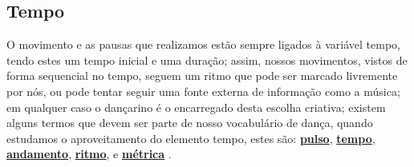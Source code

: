 \subsection{Tempo}
O movimento e as pausas que realizamos estão sempre ligados à variável tempo,
tendo estes um tempo inicial e uma duração;
assim, nossos movimentos, vistos de forma sequencial no tempo, 
seguem um ritmo que pode ser marcado livremente por nós,
ou pode tentar seguir uma fonte externa de informação como a música;
em qualquer caso o dançarino é o encarregado desta escolha criativa;
existem alguns termos que devem ser parte de nosso vocabulário de dança,
quando estudamos o aproveitamento do elemento tempo,
estes são: 
\hyperref[ref:Pulso]{\textbf{pulso}}, 
\hyperref[sec:Tempo]{\textbf{tempo}}, 
\hyperref[sec:Andamento]{\textbf{andamento}}, 
\hyperref[sec:pos:Ritmo]{\textbf{ritmo}}, e 
\hyperref[def:Metrica]{\textbf{métrica}}
\cite[pp. 82]{schrader2005sense}
\cite[pp. 131, 134, 136]{mccutchen2006teaching}.

